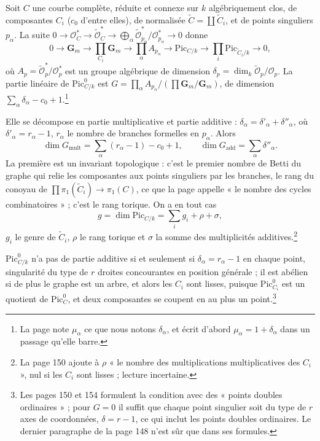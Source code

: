 \documentclass[11pt,a4paper]{article}
\begin{document}
Soit $C$ une courbe complète, réduite et connexe sur $k$ algébriquement clos,
de composantes $C_i$ ($c_0$ d'entre elles), de normalisée
$\tilde{C} = \coprod \tilde{C}_i$, et de points singuliers $p_\alpha$. La suite
$0 \to \mathcal{O}^*_C \to \tilde{\mathcal{O}}^*_C \to \bigoplus_\alpha \tilde{\mathcal{O}}^*_{p_\alpha}/\mathcal{O}^*_{p_\alpha} \to 0$
donne
\[
0 \to \mathbf{G}_m \to \prod_{C_i}\mathbf{G}_m \to \prod_\alpha A_{p_\alpha} \to \mathrm{Pic}_{C/k} \to \prod_i \mathrm{Pic}_{\tilde{C}_i/k} \to 0 ,
\]
où $A_{p} = \tilde{\mathcal{O}}^*_{p}/\mathcal{O}^*_{p}$ est un groupe
algébrique de dimension $\delta_p = \dim_k \tilde{\mathcal{O}}_p/\mathcal{O}_p$.
La partie linéaire de $\mathrm{Pic}^0_{C/k}$ est
$G = \prod_\alpha A_{p_\alpha} / (\prod \mathbf{G}_m/\mathbf{G}_m)$, de
dimension $\sum_\alpha \delta_\alpha - c_0 + 1$.\footnote{La page note
$\mu_\alpha$ ce que nous notons $\delta_\alpha$, et écrit d'abord
$\mu_\alpha = 1 + \delta_\alpha$ dans un passage qu'elle barre.}

Elle se décompose en partie multiplicative et partie additive :
$\delta_\alpha = \delta'_\alpha + \delta''_\alpha$, où $\delta'_\alpha = r_\alpha - 1$,
$r_\alpha$ le nombre de branches formelles en $p_\alpha$. Alors
\[
\dim G_{\mathrm{mult}} = \sum_\alpha (r_\alpha - 1) - c_0 + 1, \qquad
\dim G_{\mathrm{add}} = \sum_\alpha \delta''_\alpha .
\]
La première est un invariant topologique : c'est le premier nombre de Betti du
graphe qui relie les composantes aux points singuliers par les branches, le
rang du conoyau de $\prod \pi_1(\tilde{C}_i) \to \pi_1(C)$, ce que la page
appelle « le nombre des cycles combinatoires » ; c'est le rang torique. On a
en tout cas
\[
g = \dim \mathrm{Pic}_{C/k} = \sum_i g_i + \rho + \sigma ,
\]
$g_i$ le genre de $\tilde{C}_i$, $\rho$ le rang torique et $\sigma$ la somme des
multiplicités additives.\footnote{La page 150 ajoute à $\rho$ « le nombre des
multiplications multiplicatives des $C_i$ », nul si les $C_i$ sont lisses ;
lecture incertaine.}

$\mathrm{Pic}^0_{C/k}$ n'a pas de partie additive si et seulement si
$\delta_\alpha = r_\alpha - 1$ en chaque point, singularité du type de $r$
droites concourantes en position générale ; il est abélien si de plus le graphe
est un arbre, et alors les $C_i$ sont lisses, puisque
$\mathrm{Pic}^0_{C_i}$ est un quotient de $\mathrm{Pic}^0_C$, et deux
composantes se coupent en au plus un point.\footnote{Les pages 150 et 154
formulent la condition avec des « points doubles ordinaires » ; pour $G = 0$
il suffit que chaque point singulier soit du type de $r$ axes de coordonnées,
$\delta = r - 1$, ce qui inclut les points doubles ordinaires. Le dernier
paragraphe de la page 148 n'est sûr que dans ses formules.}
\end{document}
